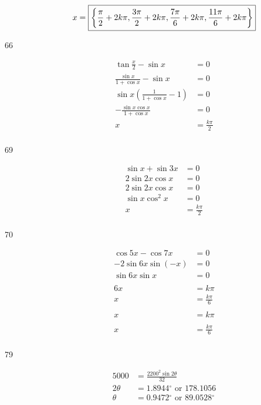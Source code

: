 \documentclass{exam}
\newcommand{\dg}{\ensuremath{^\circ}}
\begin{document}
\begin{description}
        \[
          x = \boxed{ \left\{ \frac{\pi}{2} + 2k \pi, \frac{3 \pi}{2} + 2k \pi, \frac{7 \pi}{6} + 2k \pi, \frac{11 \pi}{6} + 2k \pi \right\} } \\
        \]

      \item[66] 
        \begin{align*}
          \tan \frac{x}{2} - \sin x                      & = 0 \\
          \frac{\sin x}{1 + \cos x} - \sin x             & = 0 \\
          \sin x \left( \frac{1}{1 + \cos x} - 1 \right) & = 0 \\
          - \frac{\sin x \cos x}{1 + \cos x}             & = 0 \\
          x                                              & = \boxed{ \frac{k \pi}{2} } \\
        \end{align*}

      \item[69] 
        \begin{align*}
          \sin x + \sin 3x & = 0 \\
          2 \sin 2x \cos x & = 0 \\
          2 \sin 2x \cos x & = 0 \\
          \sin x \cos^2 x  & = 0 \\
          x                & = \boxed{ \frac{k \pi}{2} } \\
        \end{align*}

      \item[70] 
        \begin{align*}
          \cos 5x - \cos 7x     & = 0 \\
          - 2 \sin 6x \sin (-x) & = 0 \\
          \sin 6x \sin x        & = 0 \\
          \\
          6x & = k \pi \\
          x  & = \frac{k \pi}{6} \\
          \\
          x &= k \pi \\
          \\
          x & = \boxed{ \frac{k \pi}{6} } \\
        \end{align*}

      \item[79]
        \begin{align*}
          5000     & = \frac{2200^2 \sin 2 \theta}{32} \\
          2 \theta & = 1.8944 \dg \mbox{ or } 178.1056 \\
          \theta   & = \boxed{ 0.9472 \dg \mbox{ or } 89.0528 \dg } \\
        \end{align*}


\end{description}
\end{document}
